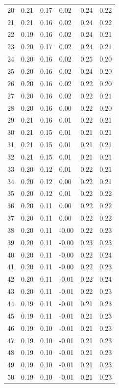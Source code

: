 \documentclass[a4paper, 12pt]{article}
\begin{document}
\begin{tabularx}{\linewidth}{|X|X|X|X|X|X|}
    20 & 0.21 & 0.17 & 0.02 & 0.24 & 0.22 \\
    21 & 0.21 & 0.16 & 0.02 & 0.24 & 0.22 \\
    22 & 0.19 & 0.16 & 0.02 & 0.24 & 0.21 \\
    23 & 0.20 & 0.17 & 0.02 & 0.24 & 0.21 \\
    24 & 0.20 & 0.16 & 0.02 & 0.25 & 0.20 \\
    25 & 0.20 & 0.16 & 0.02 & 0.24 & 0.20 \\
    26 & 0.20 & 0.16 & 0.02 & 0.22 & 0.20 \\
    27 & 0.20 & 0.16 & 0.02 & 0.22 & 0.21 \\
    28 & 0.20 & 0.16 & 0.00 & 0.22 & 0.20 \\
    29 & 0.21 & 0.16 & 0.01 & 0.22 & 0.21 \\
    30 & 0.21 & 0.15 & 0.01 & 0.21 & 0.21 \\
    31 & 0.21 & 0.15 & 0.01 & 0.21 & 0.21 \\
    32 & 0.21 & 0.15 & 0.01 & 0.21 & 0.21 \\
    33 & 0.20 & 0.12 & 0.01 & 0.22 & 0.21 \\
    34 & 0.20 & 0.12 & 0.00 & 0.22 & 0.21 \\
    35 & 0.20 & 0.12 & 0.01 & 0.22 & 0.22 \\
    36 & 0.20 & 0.11 & 0.00 & 0.22 & 0.22 \\
    37 & 0.20 & 0.11 & 0.00 & 0.22 & 0.22 \\
    38 & 0.20 & 0.11 & -0.00 & 0.22 & 0.23 \\
    39 & 0.20 & 0.11 & -0.00 & 0.23 & 0.23 \\
    40 & 0.20 & 0.11 & -0.00 & 0.22 & 0.24 \\
    41 & 0.20 & 0.11 & -0.00 & 0.22 & 0.23 \\
    42 & 0.20 & 0.11 & -0.01 & 0.22 & 0.24 \\
    43 & 0.20 & 0.11 & -0.01 & 0.22 & 0.23 \\
    44 & 0.19 & 0.11 & -0.01 & 0.21 & 0.23 \\
    45 & 0.19 & 0.11 & -0.01 & 0.21 & 0.23 \\
    46 & 0.19 & 0.10 & -0.01 & 0.21 & 0.23 \\
    47 & 0.19 & 0.10 & -0.01 & 0.21 & 0.23 \\
    48 & 0.19 & 0.10 & -0.01 & 0.21 & 0.23 \\
    49 & 0.19 & 0.10 & -0.01 & 0.21 & 0.23 \\
    50 & 0.19 & 0.10 & -0.01 & 0.21 & 0.23 \\

\end{tabularx}
\end{document}
